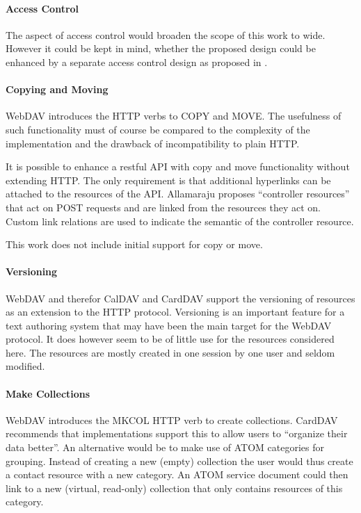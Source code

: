 \documentclass[12pt,a4paper]{scrartcl}		%
\begin{document}
\paragraph{Access Control}
The aspect of access control would broaden the scope of this work to
wide. However it could be kept in mind, whether the proposed design could be
enhanced by a separate access control design as proposed in
\cite{conf/rest/GrafZLW11}.

\paragraph{Copying and Moving}
WebDAV introduces the HTTP verbs to COPY and MOVE. The usefulness of such
functionality must of course be compared to the complexity of the implementation
and the drawback of incompatibility to plain HTTP.

It is possible to enhance a restful API with copy and move functionality without
extending HTTP. The only requirement is that additional hyperlinks can be
attached to the resources of the API. Allamaraju \cite[Ch. 11]{Allamaraju_2010} proposes
``controller resources'' that act on POST requests and are linked from the
resources they act on. Custom link relations are used to indicate the semantic
of the controller resource.

This work does not include initial support for copy or move.

\paragraph{Versioning}
WebDAV and therefor CalDAV and CardDAV support the versioning of resources as an
extension to the HTTP protocol. Versioning is an important feature for a text
authoring system that may have been the main target for the WebDAV protocol.  It
does however seem to be of little use for the resources considered here. The
resources are mostly created in one session by one user and seldom modified.

\paragraph{Make Collections}
WebDAV introduces the MKCOL HTTP verb to create collections. CardDAV recommends
that implementations support this to allow users to ``organize their data
better''. An alternative would be to make use of ATOM categories for
grouping. Instead of creating a new (empty) collection the user would thus
create a contact resource with a new category. An ATOM service document could
then link to a new (virtual, read-only) collection that only contains resources
of this category.
\end{document}
